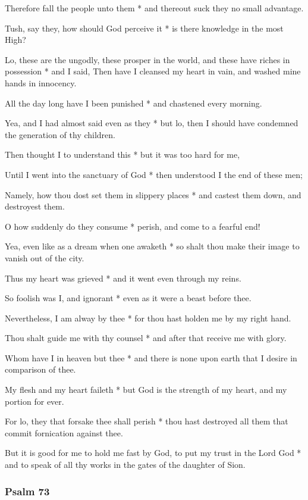 Therefore fall the people unto them * and thereout suck they no small advantage.

Tush, say they, how should God perceive it * is there knowledge in the most High?

Lo, these are the ungodly, these prosper in the world, and these have riches in possession * and I said, Then have I cleansed my heart in vain, and washed mine hands in innocency.

All the day long have I been punished * and chastened every morning.

Yea, and I had almost said even as they * but lo, then I should have condemned the generation of thy children.

Then thought I to understand this * but it was too hard for me,

Until I went into the sanctuary of God * then understood I the end of these men;

Namely, how thou dost set them in slippery places * and castest them down, and destroyest them.

O how suddenly do they consume * perish, and come to a fearful end!

Yea, even like as a dream when one awaketh * so shalt thou make their image to vanish out of the city.

Thus my heart was grieved * and it went even through my reins.

So foolish was I, and ignorant * even as it were a beast before thee.

Nevertheless, I am alway by thee * for thou hast holden me by my right hand.

Thou shalt guide me with thy counsel * and after that receive me with glory.

Whom have I in heaven but thee * and there is none upon earth that I desire in comparison of thee.

My flesh and my heart faileth * but God is the strength of my heart, and my portion for ever.

For lo, they that forsake thee shall perish * thou hast destroyed all them that commit fornication against thee.

But it is good for me to hold me fast by God, to put my trust in the Lord God * and to speak of all thy works in the gates of the daughter of Sion.

\subsubsection{Psalm 73}

